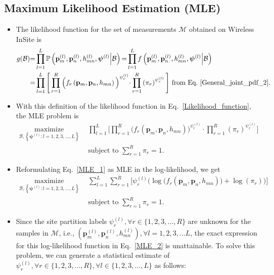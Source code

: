 \documentclass{article}
\begin{document}
\subsection{Maximum Likelihood Estimation (MLE)}
\begin{itemize}
    \item The likelihood function for the set of measurements $\mathcal{M}$ obtained on Wireless InSite is
    \begin{align}\label{Likelihood_function}
        g(\mathcal{B}){=}&\prod_{l{=}1}^{L}\mathbb{P}\left(\mathbf{p}_{m}^{(l)},\mathbf{p}_{n}^{(l)},h_{mn}^{(l)},\boldsymbol{\psi}^{(l)}\middle|\mathcal{B}\right){=}\prod_{l{=}1}^{L}f\left(\mathbf{p}_{m}^{(l)},\mathbf{p}_{n}^{(l)},h_{mn}^{(l)},\boldsymbol{\psi}^{(l)}\middle|\mathcal{B}\right)\nonumber\\{=}&\prod_{l{=}1}^{L}\Bigg[\prod_{r{=}1}^{R}\Big(f_{r}\left(\mathbf{p}_{m},\mathbf{p}_{n},h_{mn}\right)\Big)^{\psi_{r}^{(l)}}{\cdot}\prod_{r{=}1}^{R}\left(\pi_{r}\right)^{\psi_{r}^{(l)}}\Bigg]\text{ from Eq.~\eqref{General_joint_pdf_2}}.
    \end{align}
    \item With this definition of the likelihood function in Eq.~\eqref{Likelihood_function}, the MLE problem is
    \begin{align}\label{MLE_1}
        \underset{{\mathcal{B},\left\{\boldsymbol{\psi}^{(l)}:l{=}1,2,3,{\dots},L\right\}}}{\mathrm{maximize}}\ \ &\prod_{l{=}1}^{L}\Bigg[\prod_{r{=}1}^{R}\Big(f_{r}\left(\mathbf{p}_{m},\mathbf{p}_{n},h_{mn}\right)\Big)^{\psi_{r}^{(l)}}{\cdot}\prod_{r{=}1}^{R}\left(\pi_{r}\right)^{\psi_{r}^{(l)}}\Bigg]\nonumber\\&\text{subject to }\sum_{r{=}1}^{R}\pi_{r}{=}1.
    \end{align}
    \item Reformulating Eq.~\eqref{MLE_1} as MLE in the log-likelihood, we get
    \begin{align}\label{MLE_2}
        \underset{{\mathcal{B},\left\{\boldsymbol{\psi}^{(l)}:l{=}1,2,3,{\dots},L\right\}}}{\mathrm{maximize}}\ \ &\sum_{l{=}1}^{L}\sum_{r{=}1}^{R}\Bigg[\psi_{r}^{(l)}\Bigg(\log\Big(f_{r}\left(\mathbf{p}_{m},\mathbf{p}_{n},h_{mn}\right)\Big){+}\log\left(\pi_{r}\right)\Bigg)\Bigg]\nonumber\\&\text{subject to }\sum_{r{=}1}^{R}\pi_{r}{=}1.
    \end{align}
    \item Since the site partition labels $\psi_{r}^{(l)},{\forall}r{\in}\{1,2,3,{\dots},R\}$ are unknown for the samples in $\mathcal{M}$, i.e., $\left(\mathbf{p}_{m}^{(l)},\mathbf{p}_{n}^{(l)},h_{mn}^{(l)}\right),{\forall}l{=}1,2,3,{\dots}L$, the exact expression for this log-likelihood function in Eq.~\eqref{MLE_2} is unattainable. To solve this problem, we can generate a statistical estimate of $\psi_{r}^{(l)},{\forall}r{\in}\{1,2,3,{\dots},R\},{\forall}l{\in}\{1,2,3,{\dots},L\}$ as follows:

\end{itemize}
\end{document}

